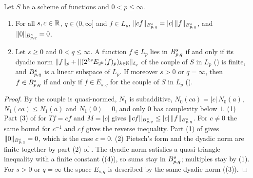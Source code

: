 \begin{lemma}
\label{lem:besov-linear}
\leanok
{}
Let $S$ be a scheme of functions and $0 < p \leq \infty$.
\begin{enumerate}
  \item For all $s, c \in \mathbb{R}$, $q \in (0, \infty]$ and $f \in L_p$,
    $\|cf\|_{B^{s}_{p,q}} = |c| \, \|f\|_{B^{s}_{p,q}}$, and
    $\|0\|_{B^{s}_{p,q}} = 0$.
  \item Let $s \geq 0$ and $0 < q \leq \infty$. A function $f \in L_p$ lies in
    $B^{s}_{p,q}$ if and only if its dyadic norm
    $\|f\|_p + \|(2^{ks} E_{2^k}(f)_p)_{k \in \mathbb{N}}\|_{\ell_q}$ of the couple of $S$ in $L_p$
    () is finite, and $B^{s}_{p,q}$ is a linear subspace of $L_p$. If
    moreover $s > 0$ or $q = \infty$, then $f \in B^{s}_{p,q}$ if and only if
    $f \in E_{s,q}$ for the couple of $S$ in $L_p$ ().
\end{enumerate}
\end{lemma}

\begin{proof}
\leanok
{}
By  the couple is quasi-normed, $N_1$ is subadditive,
$N_0(ca) = |c| \, N_0(a)$, $N_1(ca) \leq N_1(a)$ and $N_1(0) = 0$, and only $0$ has complexity
below $1$. (1) Part (3) of  for $T f = cf$ and $M = |c|$ gives
$\|cf\|_{B^{s}_{p,q}} \leq |c| \, \|f\|_{B^{s}_{p,q}}$. For $c \neq 0$ the same bound
for $c^{-1}$ and $cf$ gives the reverse inequality. Part (1) of  gives
$\|0\|_{B^{s}_{p,q}} = 0$, which is the case $c = 0$. (2) Pietsch's form and the dyadic
norm are finite together by part (2) of . The dyadic norm satisfies a
quasi-triangle inequality with a finite constant ((4)), so sums stay
in $B^{s}_{p,q}$; multiples stay by (1). For $s > 0$ or $q = \infty$ the space $E_{s,q}$ is
described by the same dyadic norm ((3)).
\end{proof}

